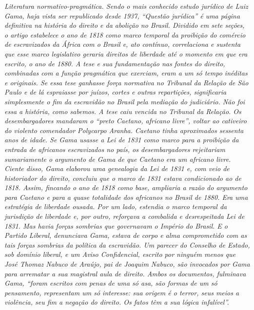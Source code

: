 {\begin{resumo} %
\emph{Literatura normativo-pragmática. Sendo o mais conhecido estudo
jurídico de Luiz Gama, haja vista ser republicado desde 1937, ``Questão
jurídica'' é uma página definitiva na história do direito e da
abolição no Brasil. Dividido em sete seções, o artigo estabelece o ano
de 1818 como marco temporal da proibição do comércio de escravizados da
África com o Brasil e, ato contínuo, correlaciona e sustenta que esse
marco legislativo geraria direitos de liberdade até o momento em que era
escrito, o ano de 1880. A tese e sua fundamentação nas fontes do
direito, combinadas com a função pragmática que exerciam, eram a um só
tempo inéditas e originais. Se essa tese ganhasse força normativa no
Tribunal da Relação de São Paulo e de lá espraiasse por juízos, cortes e
outras repartições, significaria simplesmente o fim da escravidão no
Brasil pela mediação do judiciário. Não foi essa a história, como
sabemos. A tese caiu vencida no Tribunal da Relação. Os desembargadores
mandaram o ``preto Caetano, africano livre'', voltar ao cativeiro do
violento comendador Polycarpo Aranha. Caetano tinha aproximados sessenta
anos de idade. Se Gama usasse a Lei de 1831 como marco para a proibição
da entrada de africanos escravizados no país, os desembargadores
rejeitariam sumariamente o argumento de Gama de que Caetano era um
africano livre. Ciente disso, Gama elaborou uma genealogia da Lei de
1831 e, com veio de historiador do direito, concluiu que o marco de 1831
estava condicionado ao de 1818. Assim, fincando o ano de 1818 como base,
ampliaria a razão do argumento para Caetano e para a quase totalidade
dos africanos no Brasil de 1880. Era uma estratégia de liberdade ousada.
Por um lado, estendia o marco temporal da jurisdição de liberdade e, por
outro, reforçava a combalida e desrespeitada Lei de 1831. Mas havia
forças sombrias que governavam o Império do Brasil. E o Partido Liberal,
denunciava Gama, estava de corpo e alma comprometido com as tais forças
sombrias da política da escravidão. Um parecer do Conselho de Estado,
sob domínio liberal, e um Aviso Confidencial, escrito por ninguém menos
que José Thomaz Nabuco de Araújo, pai de Joaquim Nabuco, são invocados
por Gama para arrematar a sua magistral aula de direito. Ambos os
documentos, fulminava Gama, ``foram escritos com penas de uma só asa, são
formas de um só pensamento, representam um só interesse: sua origem é o
terror, seus meios a violência, seu fim a negação do direito. Os fatos têm
a sua lógica infalível''. }
\end{resumo}

}
